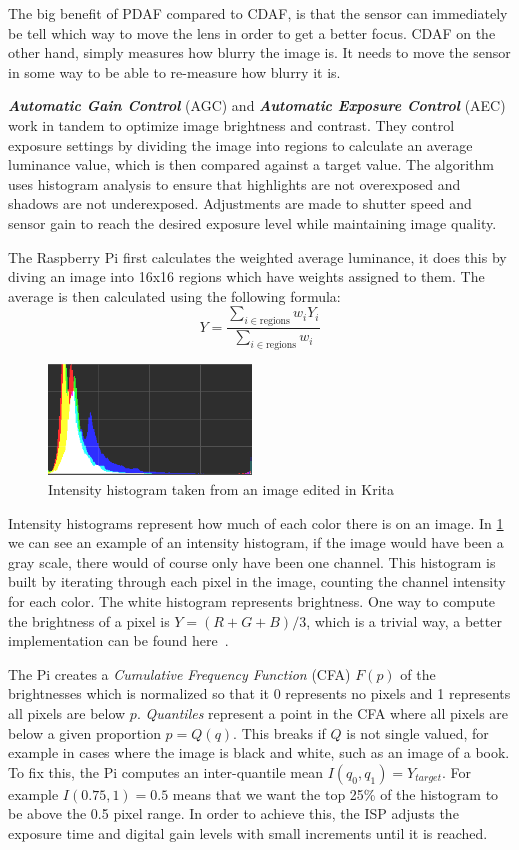 The big benefit of PDAF compared to CDAF, is that the sensor can
immediately be tell which way to move the lens in order to get a better focus.
CDAF on the other hand, simply measures how blurry the image is. It needs to
move the sensor in some way to be able to re-measure how blurry it is.

\textit{\textbf{Automatic Gain Control}} (AGC) and \textit{\textbf{Automatic
Exposure Control}} (AEC) work in tandem to optimize image brightness and
contrast. They control exposure settings by dividing the image into regions to
calculate an average luminance value, which is then compared against a target
value. The algorithm uses histogram analysis to ensure that highlights are not
overexposed and shadows are not underexposed. Adjustments are made to shutter
speed and sensor gain to reach the desired exposure level while maintaining
image quality.

The Raspberry Pi first calculates the weighted average luminance, it does this
by diving an image into 16x16 regions which have weights assigned to them. The
average is then calculated using the following formula:~\[Y = \frac{\sum_{i \in \text{regions}} w_i Y_i}{\sum_{i \in \text{regions}} w_i}\]

\begin{figure}
    \centering
    \includegraphics[width=0.48\textwidth]{figures/histogram.png}
    \caption{Intensity histogram taken from an image edited in Krita}
    \label{fig:intensityhistogram}
\end{figure}
Intensity histograms represent how much of each color there is on an image. In
\cref{fig:intensityhistogram} we can see an example of an intensity histogram,
if the image would have been a gray scale, there would of course only have been
one channel. This histogram is built by iterating through each pixel in the
image, counting the channel intensity for each color. The white histogram
represents brightness. One way to compute the brightness of a pixel is $Y = (R
+ G + B) / 3$, which is a trivial way, a better implementation can be found
here~\cite{kumar2010theory}.

The Pi creates a \textit{Cumulative Frequency Function} (CFA) $F(p)$ of the brightnesses which
is normalized so that it 0 represents no pixels and 1 represents all pixels are
below $p$. \textit{Quantiles} represent a point in the CFA where all pixels are
below a given proportion $p = Q(q)$. This breaks if $Q$ is not single valued,
for example in cases where the image is black and white, such as an image of
a book. To fix this, the Pi computes an inter-quantile mean
$I(q_0, q_1) = Y_{target}$. For example $I(0.75, 1) = 0.5$ means that we want
the top 25\% of the histogram to be above the 0.5 pixel range. In order to
achieve this, the ISP adjusts the exposure time and digital gain levels with
small increments until it is reached.

